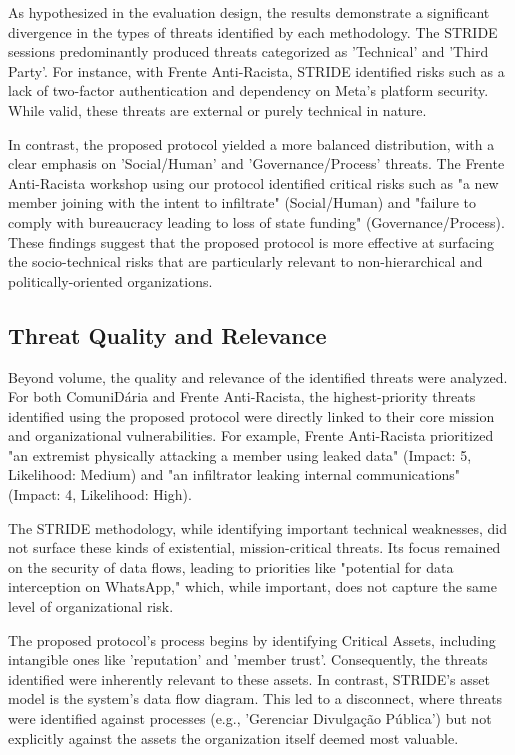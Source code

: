 As hypothesized in the evaluation design, the results demonstrate a
significant divergence in the types of threats identified by each methodology.
The STRIDE sessions predominantly produced threats categorized as 'Technical'
and 'Third Party'. For instance, with Frente Anti-Racista, STRIDE identified
risks such as a lack of two-factor authentication and dependency on Meta's
platform security. While valid, these threats are external or purely
technical in nature.

In contrast, the proposed protocol yielded a more balanced distribution, with
a clear emphasis on 'Social/Human' and 'Governance/Process' threats. The Frente
Anti-Racista workshop using our protocol identified critical risks such as "a new
member joining with the intent to infiltrate" (Social/Human) and "failure to comply
with bureaucracy leading to loss of state funding" (Governance/Process). These
findings suggest that the proposed protocol is more effective at surfacing the
socio-technical risks that are particularly relevant to non-hierarchical and
politically-oriented organizations.

\subsection{Threat Quality and Relevance}
\label{subsec:threat_quality_relevance}

Beyond volume, the quality and relevance of the identified threats were analyzed.
For both ComuniDária and Frente Anti-Racista, the highest-priority threats identified
using the proposed protocol were directly linked to their core mission and organizational
vulnerabilities. For example, Frente Anti-Racista prioritized "an extremist physically
attacking a member using leaked data" (Impact: 5, Likelihood: Medium) and "an infiltrator
leaking internal communications" (Impact: 4, Likelihood: High).

The STRIDE methodology, while identifying important technical weaknesses, did not surface
these kinds of existential, mission-critical threats. Its focus remained on the security
of data flows, leading to priorities like "potential for data interception on WhatsApp,"
which, while important, does not capture the same level of organizational risk.

The proposed protocol's process begins by identifying Critical Assets, including
intangible ones like 'reputation' and 'member trust'. Consequently, the threats
identified were inherently relevant to these assets. In contrast, STRIDE's asset model is
the system's data flow diagram. This led to a disconnect, where threats were identified
against processes (e.g., 'Gerenciar Divulgação Pública') but not explicitly against the
assets the organization itself deemed most valuable.

